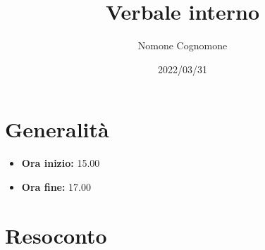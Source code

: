 \documentclass{classes/base}
\title{Verbale interno}
\date{2022/03/31}
\author{Nomone Cognomone}
\renewcommand{\maketitle}{
    
}
\begin{document}
    \maketitle

    \section{Generalità}
    \begin{itemize}
        \item \textbf{Ora inizio:} 15.00
        \item \textbf{Ora fine:} 17.00
    \end{itemize}

    \section{Resoconto}
\end{document}
